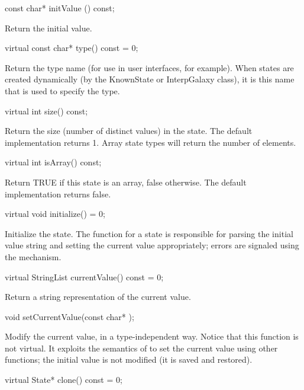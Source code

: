 \begin{example}
const char* initValue () const;
\end{example}

Return the initial value.

\begin{example}
virtual const char* type() const = 0;
\end{example}

Return the type name (for use in user interfaces, for example).
When states are created dynamically (by the KnownState or InterpGalaxy
class), it is this name that is used to specify the type.

\begin{example}
virtual int size() const;
\end{example}

Return the size (number of distinct values) in the state.  The
default implementation returns 1.  Array state types will return the
number of elements.

\begin{example}
virtual int isArray() const;
\end{example}

Return TRUE if this state is an array, false otherwise.  The default
implementation returns false.

\begin{example}
virtual void initialize() = 0;
\end{example}

Initialize the state.  The  function for a state is
responsible for parsing the initial value string and setting the current
value appropriately; errors are signaled using the
 mechanism.

\begin{example}
virtual StringList currentValue() const = 0;
\end{example}

Return a string representation of the current value.

\begin{example}
void setCurrentValue(const char* );
\end{example}

Modify the current value, in a type-independent way.  Notice that this
function is not virtual.  It exploits the semantics of 
to set the current value using other functions; the initial value is
not modified (it is saved and restored).

\begin{example}
virtual State* clone() const = 0;
\end{example}

